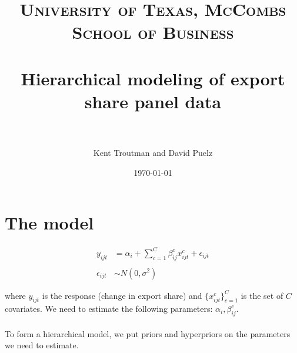 \documentclass[paper=a4, fontsize=11pt]{scrartcl} %
\title{	
\normalfont \normalsize 
\textsc{University of Texas, McCombs School of Business} \\ [25pt] %
\horrule{0.1pt} \\[.5cm] %
\Large Hierarchical modeling of export share panel data \\ %
\horrule{.1pt} \\[0cm] %
}
\subtitle{}
\author{\large Kent Troutman and David Puelz} %
\date{\normalsize\today} %
\numberwithin{equation}{section} %
\numberwithin{figure}{section} %
\numberwithin{table}{section} %
\begin{document}
\maketitle
\tableofcontents
\newpage



\section{The model}

 
\begin{align}
	y_{ijt} &= \alpha_{i} + \sum_{c=1}^{C}\beta_{ij}^{c}x_{ijt}^{c} + \epsilon_{ijt}
	\\ \nonumber
	\\
	\epsilon_{ijt} &\sim N(0,\sigma^{2})
\end{align}

where $y_{ijt}$ is the response (change in export share) and $\{ x_{ijt}^{c} \}_{c=1}^{C}$ is the set of $C$ covariates.  We need to estimate the following parameters: $\alpha_{i},\beta_{ij}^{c}$.
\\
\\
To form a hierarchical model, we put priors and hyperpriors on the parameters we need to estimate.

\begin{align}
	
\end{align}
\end{document}
